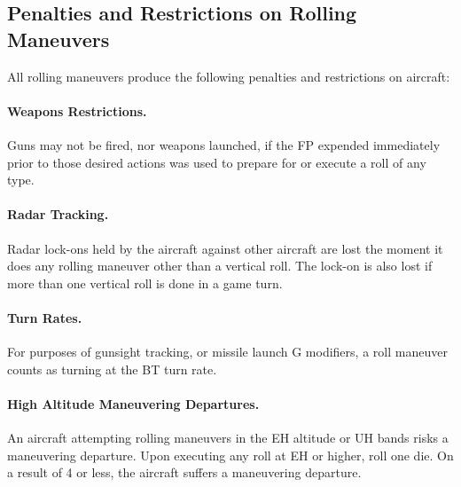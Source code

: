 \label{rule:sustained-rolling-maneuvers}

\subsection{Penalties and Restrictions on Rolling Maneuvers}

All rolling maneuvers produce the following penalties and restrictions on aircraft:


\paragraph{Weapons Restrictions.} Guns may not be fired, nor weapons launched, if the FP expended immediately prior to those desired actions was used to prepare for or execute a roll of any type.

\paragraph{Radar Tracking.} Radar lock-ons held by the aircraft against other aircraft are lost the moment it does any rolling maneuver other than a vertical roll. The lock-on is also lost if more than one vertical roll is done in a game turn.

\paragraph{Turn Rates.} For purposes of gunsight tracking, or missile launch G modifiers, a roll maneuver counts as turning at the BT turn rate.

\paragraph{High Altitude Maneuvering Departures.} An aircraft attempting rolling maneuvers in the EH altitude or UH bands risks a maneuvering departure. Upon executing any roll at EH or higher, roll one die. On a result of 4 or less, the aircraft suffers a maneuvering departure.

